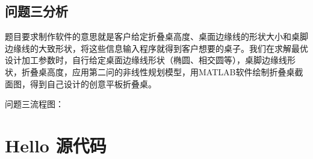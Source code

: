 \documentclass[withoutpreface,bwprint]{cumcmthesis}
\begin{document}
\subsection{问题三分析}
题目要求制作软件的意思就是客户给定折叠桌高度、桌面边缘线的形状大小和桌脚边缘线的大致形状，将这些信息输入程序就得到客户想要的桌子。我们在求解最优设计加工参数时，自行给定桌面边缘线形状（椭圆、相交圆等），桌脚边缘线形状，折叠桌高度，应用第二问的非线性规划模型，用MATLAB软件绘制折叠桌截面图，得到自己设计的创意平板折叠桌。

问题三流程图：


\nocite{*}


\newpage
\appendix
\section{Hello 源代码}

\end{document}
